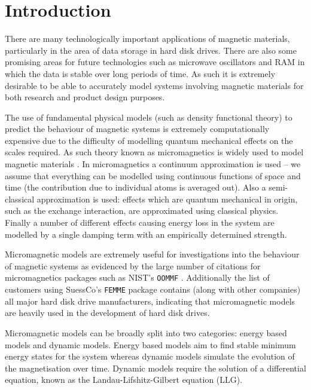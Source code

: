 
\chapter{Introduction}
\label{sec:introduction}

There are many technologically important applications of magnetic materials, particularly in the area of data storage in hard disk drives.
There are also some promising areas for future technologies such as microwave oscillators and RAM in which the data is stable over long periods of time.
As such it is extremely desirable to be able to accurately model systems involving magnetic materials for both research and product design purposes.

The use of fundamental physical models (such as density functional theory) to predict the behaviour of magnetic systems is extremely computationally expensive due to the difficulty of modelling quantum mechanical effects on the scales required.
As such theory known as micromagnetics is widely used to model magnetic materials \cite{Coey2010} \cite{Kronmuller2003}.
In micromagnetics a continuum approximation is used -- we assume that everything can be modelled using continuous functions of space and time (\ie the contribution due to individual atoms is averaged out).
Also a semi-classical approximation is used: effects which are quantum mechanical in origin, such as the exchange interaction, are approximated using classical physics.
Finally a number of different effects causing energy loss in the system are modelled by a single damping term with an empirically determined strength.

Micromagnetic models are extremely useful for investigations into the behaviour of magnetic systems as evidenced by the large number of citations for micromagnetics packages such as NIST's \texttt{OOMMF} \cite{oommf-website}.
Additionally the list of customers using SuessCo's \texttt{FEMME} package \cite{suessco-website} contains (along with other companies) all major hard disk drive manufacturers, indicating that micromagnetic models are heavily used in the development of hard disk drives.

Micromagnetic models can be broadly split into two categories: energy based models and dynamic models.
Energy based models aim to find stable minimum energy states for the system whereas
dynamic models simulate the evolution of the magnetisation over time.
Dynamic models require the solution of a differential equation, known as the Landau-Lifshitz-Gilbert equation (LLG).

